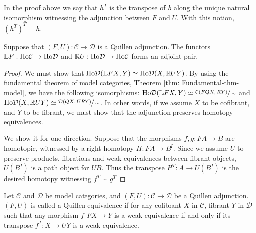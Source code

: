 \documentclass[../thesis.tex]{subfiles}
\begin{document}
            \begin{remark}
                In the proof above we say that $h^T$ is the transpose of $h$ along the unique natural isomorphism witnessing the adjunction between $F$ and $U$. With this notion, $(h^T)^T = h$.
            \end{remark}

            \begin{proposition}
                Suppose that $(F,U):\mathcal{C}\rightarrow\mathcal{D}$ is a Quillen adjunction. The functors $\mathbb{L}F:\tt{Ho}\mathcal{C}\rightarrow \tt{Ho}\mathcal{D}$ and $\mathbb{R}U: \tt{Ho}\mathcal{D}\rightarrow \tt{Ho}\mathcal{C}$ forms an adjoint pair.
            \end{proposition}

            \begin{proof}
                We must show that $\tt{Ho}\mathcal{D}(\mathbb{L}FX, Y) \simeq \tt{Ho}\mathcal{D}(X, \mathbb{R}UY)$. By using the fundamental theorem of model categories, Theorem \ref{thm: Fundamental-thm-model}, we have the following isomorphisms: $\tt{Ho}\mathcal{D}(\mathbb{L}FX,Y)\simeq \sfrac{\mathcal{C}(FQX,RY)}{\sim}$ and $\tt{Ho}\mathcal{D}(X,\mathbb{R}UY)\simeq\sfrac{\mathcal{D}(QX,URY)}{\sim}$. In other words, if we assume $X$ to be cofibrant, and $Y$ to be fibrant, we must show that the adjunction preserves homotopy equivalences.

                We show it for one direction. Suppose that the morphisms $f,g:FA\rightarrow B$ are homotopic, witnessed by a right homotopy $H:FA\rightarrow B^I$. Since we assume $U$ to preserve products, fibrations and weak equivalences between fibrant objects, $U(B^I)$ is a path object for $UB$. Thus the transpose $H^T:A\rightarrow U(B^I)$ is the desired homotopy witnessing $f^T \sim g^T$
            \end{proof}

            \begin{definition}
                Let $\mathcal{C}$ and $\mathcal{D}$ be model categories, and $(F,U):\mathcal{C}\rightarrow\mathcal{D}$ be a Quillen adjunction. $(F,U)$ is called a Quillen equivalence if for any cofibrant $X$ in $\mathcal{C}$, fibrant $Y$ in $\mathcal{D}$ such that any morphism $f:FX\rightarrow Y$ is a weak equivalence if and only if its transpose $f^T:X\rightarrow UY$ is a weak equivalence.
            \end{definition}
\end{document}
